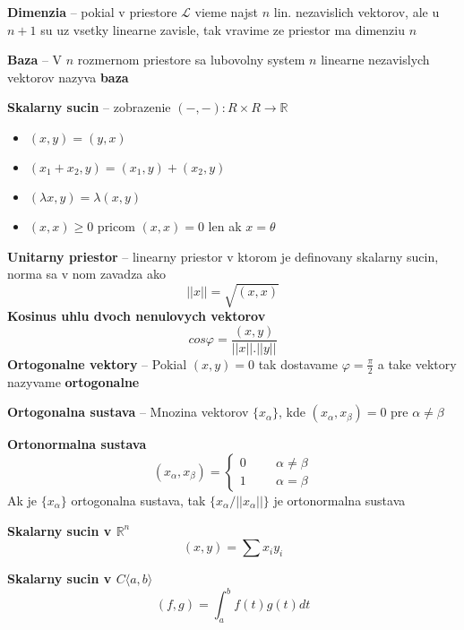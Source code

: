\documentclass[12pt]{article}
\begin{document}
\textbf{Dimenzia} -- pokial v priestore $\mathcal{L}$ vieme najst $n$ lin. nezavislich vektorov, ale u $n+1$ su uz vsetky linearne zavisle,
tak vravime ze priestor ma dimenziu $n$

\textbf{Baza} -- V $n$ rozmernom priestore sa lubovolny system $n$ linearne nezavislych vektorov nazyva \textbf{baza}

\textbf{Skalarny sucin} -- zobrazenie $(-,-) : R \times R \to \mathbb{R}$
\begin{itemize}
	\item $(x,y) = (y,x)$
	\item $(x_{1} + x_{2},y) = (x_{1},y) + (x_{2},y)$
	\item $(\lambda x,y) = \lambda(x,y)$
	\item $(x,x) \ge 0$ pricom $(x,x) = 0$ len ak $x = \theta$
\end{itemize}
\textbf{Unitarny priestor} -- linearny priestor v ktorom je definovany skalarny sucin, norma sa v nom zavadza ako
\begin{equation*}
	||x|| = \sqrt{(x,x)}
\end{equation*}
\textbf{Kosinus uhlu dvoch nenulovych vektorov}
\begin{equation*}
	cos \varphi = \frac{(x,y)}{||x||.||y||}
\end{equation*}
\textbf{Ortogonalne vektory} -- Pokial $(x,y) = 0$ tak dostavame $\varphi = \frac{\pi}{2}$ a take vektory nazyvame \textbf{ortogonalne}

\textbf{Ortogonalna sustava} -- Mnozina vektorov $\{x_{\alpha}\}$, kde $(x_{\alpha},x_{\beta}) = 0$ pre $\alpha \not= \beta$

\textbf{Ortonormalna sustava}
\begin{equation*}
	(x_{\alpha},x_{\beta}) = \begin{cases}
		0 \hspace{1cm} \alpha \not= \beta \\
		1 \hspace{1cm} \alpha = \beta
	\end{cases}
\end{equation*}
Ak je $\{x_{\alpha}\}$ ortogonalna sustava, tak $\{x_{\alpha}/||x_{\alpha}||\}$ je ortonormalna sustava

\textbf{Skalarny sucin v $\mathbb{R}^{n}$}
\begin{equation*}
	(x,y) = \sum{x_{i}y_{i}}
\end{equation*}

\textbf{Skalarny sucin v $C\langle a,b \rangle$}
\begin{equation*}
	(f,g) = \int_{a}^{b}f(t)g(t)dt
\end{equation*}
\end{document}

